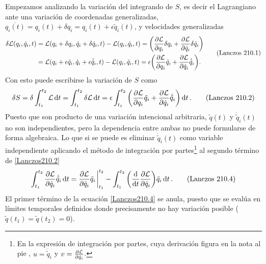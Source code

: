 \documentclass[12pt, spanish, a4paper, ]{article}
\begin{document}
Empezamos analizando la variación del integrando de \(S\), es decir el Lagrangiano ante una variación de coordenadas generalizadas, \(\overline{q_i (t)}= q_i(t) + \delta q_i = q_i (t)+ \epsilon \tilde{q}_i (t)\), y velocidades generalizadas
\begin{equation}\label{Lanczos210.1}
	\begin{aligned}
		\delta \mathcal{L}(q_i, \dot{q}_i, t)
		&= \mathcal{L}(q_i+ \delta{q}_i, \dot{q}_i+ \delta \dot{q}_i, t) - \mathcal{L}(q_i, \dot{q}_i, t)
		= \pqty{\pdv{\mathcal{L}}{q_i} \delta q_i + \pdv{\mathcal{L}}{\dot{q}_i} \delta \dot{q}_i } \notag \\
		&= \mathcal{L}(q_i+ \epsilon \tilde{q}_i, \dot{q}_i+ \epsilon \dot{\tilde{q}}_i, t) - \mathcal{L}(q_i, \dot{q}_i, t)
		= \epsilon \pqty{\pdv{\mathcal{L}}{q_i} \tilde{q}_i + \pdv{\mathcal{L}}{\dot{q}_i} \dot{\tilde{q}}_i }.
	\end{aligned}
  \tag{Lanczos 210.1}
\end{equation}
Con esto puede escribirse la variación de \(S\) como
\begin{equation}\label{Lanczos210.2}
    \delta S= \delta \int_{t_1}^{t_2 } \mathcal{L} \dd{t} = \int_{t_1}^{t_2 } \delta \mathcal{L} \dd{t} =
    \epsilon \int_{t_1}^{t_2 } \pqty{\pdv{\mathcal{L}}{q_i} \tilde{q}_i + \pdv{\mathcal{L}}{\dot{q}_i} \dot{\tilde{q}}_i } \dd{t}.
    \tag{Lanczos 210.2}
\end{equation}
Puesto que son producto de una variación intencional arbitraria, \(\tilde{q}(t)\) y \(\dot{\tilde{q}}_i(t)\) no son independientes, pero la dependencia entre ambas no puede formularse de forma algebraica.
Lo que si se puede es eliminar \(\dot{\tilde{q}}_i (t)\) como variable independiente aplicando el método de integración por partes\footnote{En la expresión de integración por partes, cuya derivación figura en la nota al pie , \(u = \dot{\tilde{q}}_i \) y \(v = \pdv{\mathcal{L}}{\dot{q}_i} \).} al segundo término de \eqref{Lanczos210.2}
\begin{equation}\label{Lanczos210.4}
    \int_{t_1}^{t_2 } \pdv{\mathcal{L}}{\dot{q}_i} \dot{\tilde{q}}_i \dd{t} =
    \pdv{\mathcal{L}}{\dot{q}_i} \tilde{q}_i \eval_{t_1}^{t_2} - \int_{t_1}^{t_2 } \pqty{ \dv{t} \pdv{\mathcal{L}}{\dot{q}_i} } \tilde{q}_i \dd{t}.
    \tag{Lanczos 210.4}
\end{equation}
El primer término de la ecuación \eqref{Lanczos210.4} se anula, puesto que se evalúa en límites temporales definidos donde precisamente no hay variación posible (\(\tilde{q}(t_1)= \tilde{q}(t_2)= 0\)).
\end{document}
